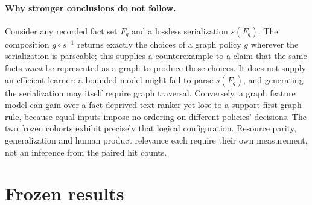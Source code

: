 \documentclass{article}
\begin{document}
\paragraph{Why stronger conclusions do not follow.}
Consider any recorded fact set $F_q$ and a lossless serialization $s(F_q)$.
The composition $g\circ s^{-1}$ returns exactly the choices of a graph
policy $g$ wherever the serialization is parseable; this supplies a
counterexample to a claim that the same facts \emph{must} be represented
as a graph to produce those choices. It does not supply an efficient
learner: a bounded model might fail to parse $s(F_q)$, and generating the
serialization may itself require graph traversal. Conversely, a graph
feature model can gain over a fact-deprived text ranker yet lose to a
support-first graph rule, because equal inputs impose no ordering on
different policies' decisions. The two frozen cohorts exhibit precisely
that logical configuration. Resource parity, generalization and human
product relevance each require their own measurement, not an inference
from the paired hit counts.

\section{Frozen results}
\end{document}
